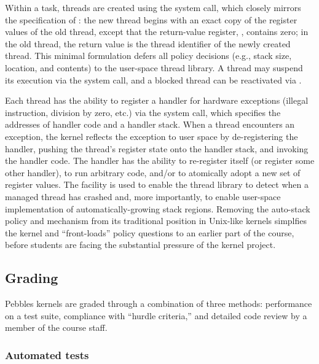 Within a task, threads are created using the
 system call, which closely
mirrors the specification of :
the new thread begins with an exact copy of the
register values of the old thread, except that
the return-value register, , contains
zero;
in the old thread, the return value is the thread identifier
of the newly created thread.
This minimal formulation defers all policy decisions
(e.g., stack size, location, and contents) to the
user-space thread library.
A thread may suspend its execution via the
 system call,
and a blocked thread can be reactivated via
.

Each thread has the ability to register a handler
for hardware exceptions (illegal instruction,
division by zero, etc.)
via the  system call,
which specifies the addresses of handler code
and a handler stack.
When a thread encounters an exception,
the kernel reflects the exception to user space
by
de-registering the handler,
pushing the thread's register state onto the handler stack,
and invoking the handler code.
The handler has the ability to re-register itself
(or register some other handler),
to run arbitrary code,
and/or to atomically adopt a new set of register
values.
The  facility is used to enable
the thread library to detect when a managed
thread has crashed
and, more importantly,
to enable user-space
implementation of automatically-growing stack
regions.
Removing the auto-stack policy and mechanism from
its traditional position in Unix-like kernels
simplfies the kernel and
``front-loads'' policy questions to an earlier
part of the course,
before students are facing the substantial pressure
of the kernel project.

\subsection{Grading}

Pebbles kernels are graded through a combination
of three methods:
performance on a test suite,
compliance with ``hurdle criteria,''
and detailed code review by a member of the course staff.

\subsubsection{Automated tests}


